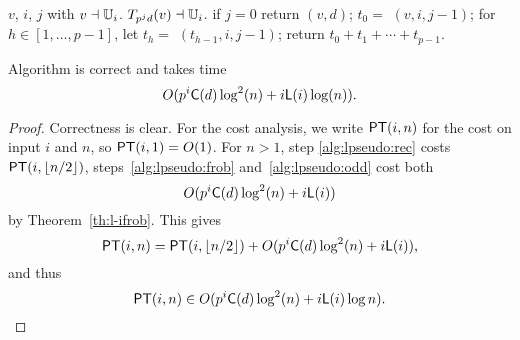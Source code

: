 \begin{algorithm}
  \caption{}
  \label{alg:pseudotrace}
  \begin{algorithmic}[1]
    \REQUIRE $v$, $i$, $j$ with $v\dashv\mathbb{U}_i$.
    \ENSURE $T_{p^jd}(v) \dashv \mathbb{U}_i$.
    \STATE \label{alg:pseudo:base} if $j = 0$ return $(v, d)$;
    \STATE \label{alg:pseudo:rec} $t_0=$ $(v, i, j-1)$;
    \STATE \label{alg:pseudo:frob}for $h\in [1,\dots,p-1]$, let $t_h=$ $(t_{h-1}, i, j-1)$;
    \STATE \label{alg:pseudo:sum}return $t_0 + t_1 + \cdots + t_{p-1}$.
  \end{algorithmic}
\end{algorithm}

\begin{theorem}
  \label{th:l-pseudo}
  Algorithm  is correct and takes time
  \begin{equation}
    \label{eq:96}
    O(p^i\mathsf{C}(d)\log^2 (n) + i \mathsf{L}(i)\log (n))
    \text{.}
  \end{equation}
\end{theorem}
\begin{proof}
  Correctness is clear. For the cost analysis, we write $\mathsf{PT}(i,n)$
  for the cost on input $i$ and $n$, so $\mathsf{PT}(i,1)=O(1)$.  For $n>1$,
  step \ref{alg:lpseudo:rec} costs $\mathsf{PT}(i,\lfloor n/2 \rfloor)$,
  steps~\ref{alg:lpseudo:frob} and~\ref{alg:lpseudo:odd} cost both
  \begin{equation}
    \label{eq:100}
    O(p^i\mathsf{C}(d)\log^2 (n) + i \mathsf{L}(i))
  \end{equation}
  by Theorem~\ref{th:l-ifrob}. This gives
  \begin{equation}
    \label{eq:98}
    \mathsf{PT}(i,n) = \mathsf{PT}(i,\lfloor
    n/2\rfloor) +O(p^i\mathsf{C}(d)\log^2 (n) + i \mathsf{L}(i))
    \text{,}
  \end{equation}
  and thus
  \begin{equation}
    \label{eq:99}
    \mathsf{PT}(i,n) \in O(p^i\mathsf{C}(d)\log^2 (n) + i \mathsf{L}(i)\log n)
    \text{.}
  \end{equation}
\end{proof}


